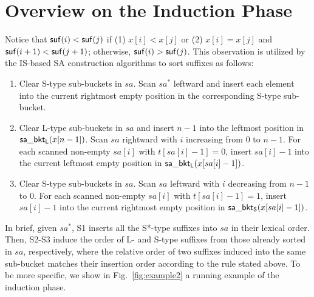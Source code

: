 \documentclass[10pt,journal,compsoc]{IEEEtran}
\begin{document}



\newpage
\appendices
\section{Overview on the Induction Phase} \label{sec:appendix}

Notice that ${\sf suf}(i) < {\sf suf}(j)$ if (1) $x[i] < x[j]$ or (2) $x[i] = x[j]$ and ${\sf suf}(i + 1) < {\sf suf}(j + 1)$; otherwise, ${\sf suf}(i) > {\sf suf}(j)$. This observation is utilized by the IS-based SA construction algorithms to sort suffixes as follows:

\begin{enumerate}[S1]
	\item 
	Clear S-type sub-buckets in $sa$. Scan $sa^*$ leftward and insert each element into the current rightmost empty position in the corresponding S-type sub-bucket.
	
	\item 
	Clear L-type sub-buckets in $sa$ and insert $n - 1$ into the leftmost position in ${\sf sa\_bkt_L}(x[n - 1])$. Scan $sa$ rightward with $i$ increasing from $0$ to $n - 1$. For each scanned non-empty $sa[i]$ with $t[sa[i] - 1] = 0$, insert $sa[i] - 1$ into the current leftmost empty position in ${\sf sa\_bkt_L}(x[sa[i] - 1])$.
	
	\item
	Clear S-type sub-buckets in $sa$. Scan $sa$ leftward with $i$ decreasing from $n - 1$ to $0$. For each scanned non-empty $sa[i]$ with $t[sa[i] - 1] = 1$, insert $sa[i] - 1$ into the current rightmost empty position in ${\sf sa\_bkt_S}(x[sa[i] - 1])$.
	
\end{enumerate}

In brief, given $sa^*$, S1 inserts all the S*-type suffixes into $sa$ in their lexical order. Then, S2-S3 induce the order of L- and S-type suffixes from those already sorted in $sa$, respectively, where the relative order of two suffixes induced into the same sub-bucket matches their insertion order according to the rule stated above. To be more specific, we show in Fig.~\ref{fig:example2} a running example of the induction phase.
\end{document}

